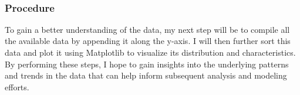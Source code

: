 \documentclass[11pt]{article}
\begin{document}
    \begin{center}
    \end{center}
    { \hspace*{\fill} \\}
    
    \hypertarget{procedure}{%
\subsubsection{Procedure}\label{procedure}}

To gain a better understanding of the data, my next step will be to
compile all the available data by appending it along the y-axis. I will
then further sort this data and plot it using Matplotlib to visualize
its distribution and characteristics. By performing these steps, I hope
to gain insights into the underlying patterns and trends in the data
that can help inform subsequent analysis and modeling efforts.
\end{document}
